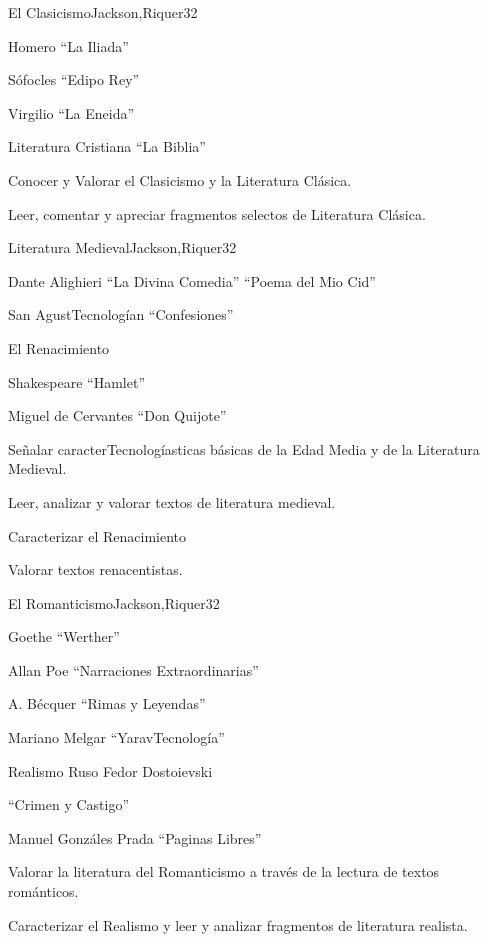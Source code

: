 \begin{syllabus}
\begin{unit}{El Clasicismo}{Jackson,Riquer}{3}{2}
\begin{topics}
	\item Homero ``La Iliada''
	\item Sófocles ``Edipo Rey''
	\item Virgilio ``La Eneida''
	\item Literatura Cristiana ``La Biblia''
\end{topics}
\begin{unitgoals}
	\item Conocer y Valorar el Clasicismo y la Literatura Clásica.
	\item Leer, comentar y apreciar fragmentos selectos de Literatura Clásica.
\end{unitgoals}
\end{unit}
\begin{unit}{Literatura Medieval}{Jackson,Riquer}{3}{2}
\begin{topics}
	\item Dante Alighieri ``La Divina Comedia'' ``Poema del Mio Cid''
	\item    San AgustTecnologían ``Confesiones''  
	\item    El Renacimiento
	\item    Shakespeare ``Hamlet''
	\item    Miguel de Cervantes ``Don Quijote''
\end{topics}
\begin{unitgoals}
	\item Señalar caracterTecnologíasticas básicas de la Edad Media y de la Literatura Medieval.
	\item Leer, analizar y valorar textos de literatura medieval.
	\item Caracterizar el Renacimiento
	\item Valorar textos renacentistas.
\end{unitgoals}
\end{unit}

\begin{unit}{El Romanticismo}{Jackson,Riquer}{3}{2}
\begin{topics}
	\item Goethe ``Werther''
	\item Allan Poe ``Narraciones Extraordinarias''
	\item A. Bécquer ``Rimas y Leyendas''
	\item Mariano Melgar ``YaravTecnología''
	\item Realismo Ruso Fedor Dostoievski 
	\item ``Crimen y Castigo''
	\item Manuel Gonzáles Prada ``Paginas Libres''
\end{topics}
\begin{unitgoals}
	\item Valorar la literatura del Romanticismo a través de la lectura de textos románticos.
	\item Caracterizar el Realismo y leer y analizar fragmentos de literatura realista.
\end{unitgoals}
\end{unit}


\end{syllabus}
